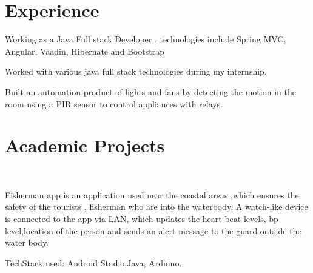 \documentclass[]{deedy-resume-openfont}
\begin{document}
\begin{minipage}[t]{0.66\textwidth} 


\section{Experience}

\vspace{\topsep} %
\begin{tightemize}
\item Working as a Java Full stack Developer , technologies include Spring MVC, Angular, Vaadin, Hibernate and Bootstrap
\end{tightemize}
\sectionsep

\begin{tightemize}
\item Worked with various java full stack technologies during my internship.
\end{tightemize}

\begin{tightemize}
\item Built an automation product of lights and fans by
detecting the motion in the room using a PIR sensor to control appliances with relays.
\end{tightemize}
\sectionsep


\section{Academic Projects}
\\
\begin{tightemize}
\item Fisherman app is an application used near the coastal areas ,which ensures the safety of the tourists , fisherman who are into the waterbody. A watch-like device is connected to the app via LAN, which updates the heart beat levels, bp level,location of the person and sends an alert message to the guard outside the water body. 
\item TechStack used: Android Studio,Java, Arduino.
\end{tightemize}
\sectionsep


\end{minipage}
\end{document}
